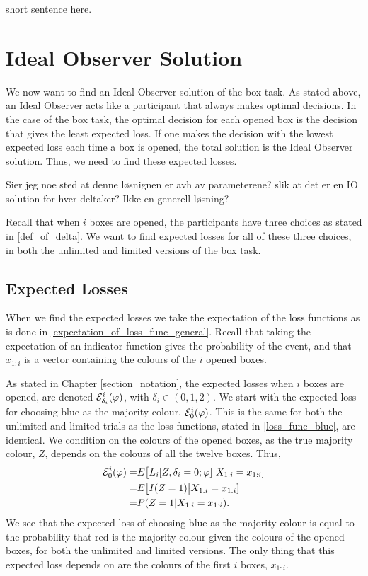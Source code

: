 short sentence here. 


\section{Ideal Observer Solution}
We now want to find an Ideal Observer solution of the box task. As stated above, an Ideal Observer acts like a participant that always makes optimal decisions. In the case of the box task, the optimal decision for each opened box is the decision that gives the least expected loss. If one makes the decision with the lowest expected loss each time a box is opened, the total solution is the Ideal Observer solution. Thus, we need to find these expected losses. 

Sier jeg noe sted at denne løsnignen er avh av parameterene? slik at det er en IO solution for hver deltaker? Ikke en generell løsning?

Recall that when $i$ boxes are opened, the participants have three choices as stated in \eqref{def_of_delta}. We want to find expected losses for all of these three choices, in both the unlimited and limited versions of the box task.  


 

\subsection{Expected Losses}
\label{section:exp_losses}
When we find the expected losses we take the expectation of the loss functions as is done in \eqref{expectation_of_loss_func_general}. Recall that taking the expectation of an indicator function gives the probability of the event, and that $x_{1:i}$ is a vector containing the colours of the $i$ opened boxes.

As stated in Chapter \ref{section_notation}, the expected losses when $i$ boxes are opened, are denoted $\mathcal{E}_{\delta_i}^i(\varphi)$, with $\delta_i \in (0,1,2)$.
We start with the expected loss for choosing blue as the majority colour, $\mathcal{E}^i_0(\varphi)$. This is the same for both the unlimited and limited trials as the loss functions, stated in \eqref{loss_func_blue}, are identical. 
We condition on the colours of the opened boxes, as the true majority colour, $Z$, depends on the colours of all the twelve boxes. Thus,
\begin{equation}
\label{exp_loss_blue}
    \begin{aligned}
        \mathcal{E}^i_{0}(\varphi) = &E\big[ L_i[Z,\delta_i=0;\varphi] \big |X_{1:i}=x_{1:i} ]\\
        = & E \big[ I(Z=1) \big|X_{1:i}=x_{1:i}]\\
        = & P(Z=1|X_{1:i}=x_{1:i}).
    \end{aligned}
\end{equation}
We see that the expected loss of choosing blue as the majority colour is equal to the probability that red is the majority colour given the colours of the opened boxes, for both the unlimited and limited versions. The only thing that this expected loss depends on are the colours of the first $i$ boxes, $x_{1:i}$. 

